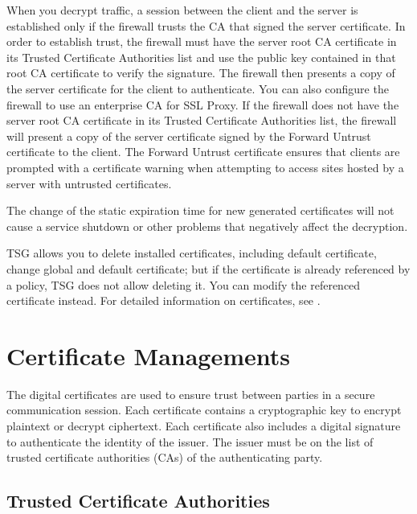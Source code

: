 When you decrypt traffic, a session between the client and the server is established only if the firewall trusts the CA that signed the server certificate. In order to establish trust, the firewall must have the server root CA certificate in its Trusted Certificate Authorities list and use the public key contained in that root CA certificate to verify the signature. The firewall then presents a copy of the server certificate for the client to authenticate. You can also configure the firewall to use an enterprise CA for SSL Proxy. If the firewall does not have the server root CA certificate in its Trusted Certificate Authorities list, the firewall will present a copy of the server certificate signed by the Forward Untrust certificate to the client. The Forward Untrust certificate ensures that clients are prompted with a certificate warning when attempting to access sites hosted by a server with untrusted certificates.


The change of the static expiration time for new generated certificates will not cause a service shutdown or other problems that negatively affect the decryption.


TSG allows you to delete installed certificates, including default certificate, change global and default certificate; 
but if the certificate is already referenced by a policy, TSG does not allow deleting it. You can modify the referenced certificate instead. 
For detailed information on certificates, see \hyperlink{link:Certificate Management}{\color{linkblue}{Certificate Management}}.

\section*{\hypertarget{link:Certificate Managements}{Certificate Managements}}
\label{sec:decrypt:certificate}

The digital certificates are used to ensure trust between parties in a secure communication session. 
Each certificate contains a cryptographic key to encrypt plaintext or decrypt ciphertext. 
Each certificate also includes a digital signature to authenticate the identity of the issuer. 
The issuer must be on the list of trusted certificate authorities (CAs) of the authenticating party.

\subsection*{\hypertarget{link:Trusted Certificate Authorities}{Trusted Certificate Authorities}}
\label{sec:decrypt:certificate:trusted}

